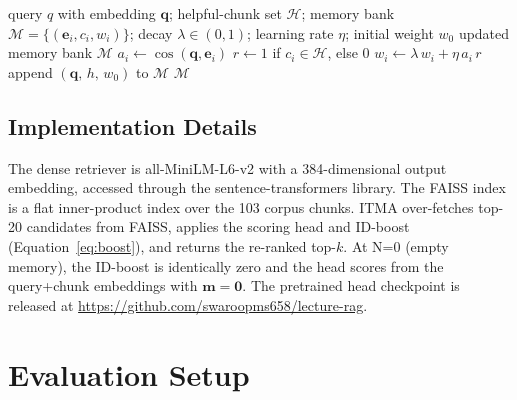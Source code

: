 \documentclass[preprint,12pt]{elsarticle}
\begin{document}
\begin{algorithm}[htbp]
\caption{Counterfactual memory update after feedback.}
\label{alg:update}
\begin{algorithmic}[1]
\REQUIRE query $q$ with embedding $\mathbf{q}$; helpful-chunk set $\mathcal{H}$;
  memory bank $\mathcal{M}=\{(\mathbf{e}_i,c_i,w_i)\}$; decay
  $\lambda\in(0,1)$; learning rate $\eta$; initial weight $w_0$
\ENSURE updated memory bank $\mathcal{M}$
  \STATE $a_i \leftarrow \cos(\mathbf{q},\mathbf{e}_i)$ 
  \STATE $r \leftarrow 1$ if $c_i \in \mathcal{H}$, else $0$ 
  \STATE $w_i \leftarrow \lambda\,w_i + \eta\,a_i\,r$ 
\ENDFOR
{}
  \STATE append $(\mathbf{q},\,h,\,w_0)$ to $\mathcal{M}$ 
\ENDFOR
\RETURN $\mathcal{M}$
\end{algorithmic}
\end{algorithm}

\subsection{Implementation Details}
The dense retriever is all-MiniLM-L6-v2 with a 384-dimensional output
embedding, accessed through the sentence-transformers library.  The FAISS
index is a flat inner-product index over the 103 corpus chunks.  ITMA
over-fetches top-20 candidates from FAISS, applies the scoring head and
ID-boost (Equation~\ref{eq:boost}), and returns the re-ranked top-$k$.  At
N=0 (empty memory), the ID-boost is identically zero and the head scores from
the query+chunk embeddings with $\mathbf{m}=\mathbf{0}$.  The pretrained head
checkpoint is released at \url{https://github.com/swaroopms658/lecture-rag}.

\section{Evaluation Setup}
\label{sec:eval}
\end{document}

